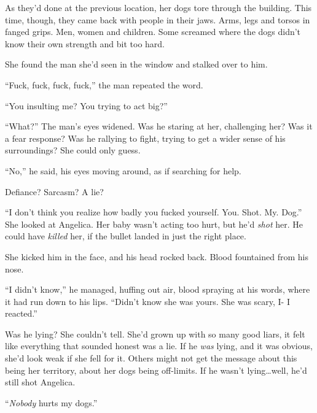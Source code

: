 As they'd done at the previous location, her dogs tore through the building.  This time, though, they came back with people in their jaws.  Arms, legs and torsos in fanged grips.  Men, women and children.  Some screamed where the dogs didn't know their own strength and bit too hard.



She found the man she'd seen in the window and stalked over to him.



``Fuck, fuck, fuck, fuck,'' the man repeated the word.



``You insulting me?  You trying to act big?''



``What?''  The man's eyes widened.  Was he staring at her, challenging her?  Was it a fear response?  Was he rallying to fight, trying to get a wider sense of his surroundings?  She could only guess.



``No,'' he said, his eyes moving around, as if searching for help.



Defiance?  Sarcasm?  A lie?



``I don't think you realize how badly you fucked yourself.  You.  Shot.  My.  Dog.''  She looked at Angelica.  Her baby wasn't acting too hurt, but he'd \emph{shot} her.  He could have \emph{killed} her, if the bullet landed in just the right place.



She kicked him in the face, and his head rocked back.  Blood fountained from his nose.



``I didn't know,'' he managed, huffing out air, blood spraying at his words, where it had run down to his lips.  ``Didn't know she was yours.  She was scary, I- I reacted.''



Was he lying?  She couldn't tell.  She'd grown up with so many good liars, it felt like everything that sounded honest was a lie.  If he \emph{was} lying, and it was obvious, she'd look weak if she fell for it.  Others might not get the message about this being her territory, about her dogs being off-limits.  If he wasn't lying\ldots well, he'd still shot Angelica.



``\emph{Nobody} hurts my dogs.''



